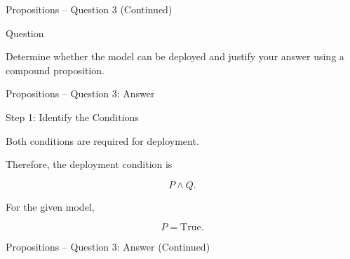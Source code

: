 \begin{frame}{Propositions -- Question 3 (Continued)}

\begin{block}{Question}

Determine whether the model can be deployed and justify your answer
using a compound proposition.

\end{block}

\end{frame}


\begin{frame}{Propositions -- Question 3: Answer}

\begin{exampleblock}{Step 1: Identify the Conditions}

Both conditions are required for deployment.

Therefore, the deployment condition is

$$
P\land Q.
$$

For the given model,

$$
P=\text{True}.
$$

\end{exampleblock}

\end{frame}


\begin{frame}{Propositions -- Question 3: Answer (Continued)}


\end{frame}


